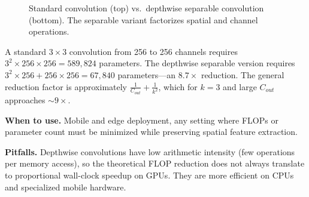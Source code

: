 \begin{figure}[H]
\centering
{}
\caption{Standard convolution (top) vs.\ depthwise separable convolution (bottom). The separable variant factorizes spatial and channel operations.}
\label{fig:depthwise_separable}
\end{figure}

\begin{keyinsight}[Depthwise Separable = Spatial Filtering + Channel Mixing, Decomposed]
A standard $3 \times 3$ convolution from 256 to 256 channels requires $3^2 \times 256 \times 256 = 589{,}824$ parameters. The depthwise separable version requires $3^2 \times 256 + 256 \times 256 = 67{,}840$ parameters---an $8.7\times$ reduction. The general reduction factor is approximately $\frac{1}{C_{out}} + \frac{1}{k^2}$, which for $k=3$ and large $C_{out}$ approaches $\sim 9\times$.
\end{keyinsight}

\textbf{When to use.} Mobile and edge deployment, any setting where FLOPs or parameter count must be minimized while preserving spatial feature extraction.

\textbf{Pitfalls.} Depthwise convolutions have low arithmetic intensity (few operations per memory access), so the theoretical FLOP reduction does not always translate to proportional wall-clock speedup on GPUs. They are more efficient on CPUs and specialized mobile hardware.

